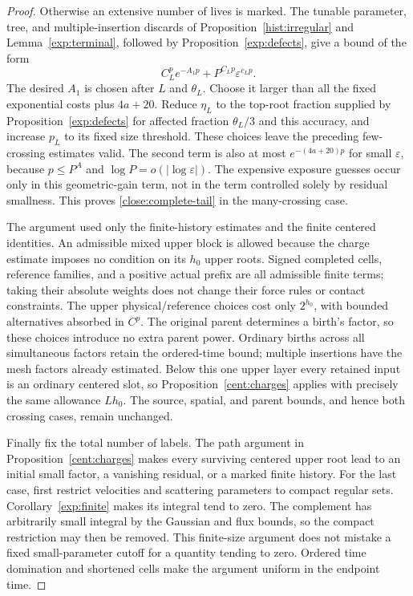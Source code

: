 \begin{proof}
Otherwise an extensive number of lives is marked. The tunable
parameter, tree, and multiple-insertion discards of
Proposition~\ref{hist:irregular} and
Lemma~\ref{exp:terminal}, followed by
Proposition~\ref{exp:defects}, give a bound of the form
\begin{equation}\label{close:many-cross}
 C_L^p e^{-A_1p}
 +P^{C_Lp}\varepsilon^{c_Lp}.
\end{equation}
The desired $A_1$ is chosen after $L$ and $\theta_L$. Choose it
larger than all the fixed exponential costs plus $4a+20$.
Reduce $\eta_L$ to the top-root fraction supplied by
Proposition~\ref{exp:defects} for affected fraction $\theta_L/3$
and this accuracy, and increase $p_L$ to its fixed size threshold.
These choices leave the preceding few-crossing estimates valid.
The second term is also at most $e^{-(4a+20)p}$ for small
$\varepsilon$, because $p\leq P^A$ and
$\log P=o(|\log\varepsilon|)$. The expensive exposure guesses occur
only in this geometric-gain term, not in the term controlled
solely by residual smallness. This proves
\eqref{close:complete-tail} in the many-crossing case.

The argument used only the finite-history estimates and the
finite centered identities. An admissible mixed upper block is
allowed because the charge estimate imposes no condition on its
$h_0$ upper roots. Signed completed cells, reference families,
and a positive actual prefix are all admissible finite terms;
taking their absolute weights does not change their force rules
or contact constraints. The upper physical/reference choices
cost only $2^{h_0}$, with bounded alternatives absorbed in $C^p$.
The original parent determines a birth's factor, so these choices
introduce no extra parent power. Ordinary births across all
simultaneous factors retain the ordered-time bound; multiple
insertions have the mesh factors already estimated. Below this
one upper layer every retained input is an ordinary centered
slot, so Proposition~\ref{cent:charges} applies with precisely
the same allowance $Lh_0$. The source, spatial, and parent
bounds, and hence both crossing cases, remain unchanged.

Finally fix the total number of labels. The path argument in
Proposition~\ref{cent:charges} makes every surviving centered
upper root lead to an initial small factor, a vanishing residual,
or a marked finite history. For the last case, first restrict
velocities and scattering parameters to compact regular sets.
Corollary~\ref{exp:finite} makes its integral tend to zero. The complement has arbitrarily small integral by the
Gaussian and flux bounds, so the compact restriction may then
be removed. This finite-size argument does not mistake a fixed
small-parameter cutoff for a quantity tending to zero. Ordered
time domination and shortened cells make the argument uniform
in the endpoint time.
\end{proof}

